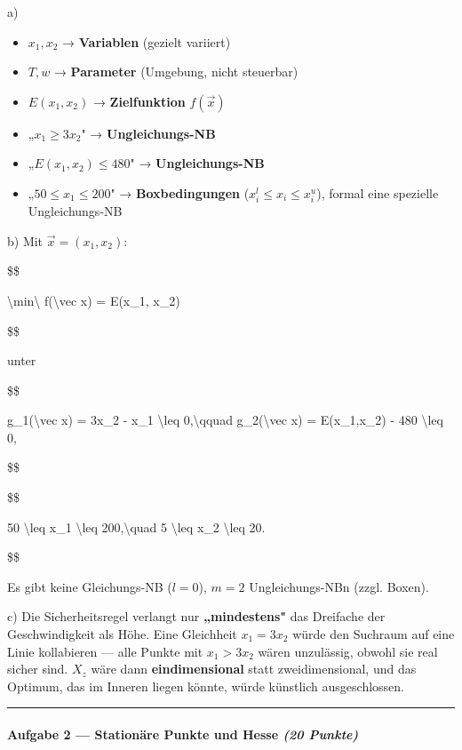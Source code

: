 \documentclass[11pt, a4paper]{article}
\begin{document}
a)

\begin{itemize}
  \item $x_1, x_2$ → \textbf{Variablen} (gezielt variiert)
  \item $T, w$ → \textbf{Parameter} (Umgebung, nicht steuerbar)
  \item $E(x_1,x_2)$ → \textbf{Zielfunktion} $f(\vec x)$
  \item „$x_1 \geq 3x_2$" → \textbf{Ungleichungs-NB}
  \item „$E(x_1,x_2) \leq 480$" → \textbf{Ungleichungs-NB}
  \item „$50 \leq x_1 \leq 200$" → \textbf{Boxbedingungen} ($x_i^l \leq x_i \leq x_i^u$), formal eine spezielle Ungleichungs-NB
\end{itemize}

b) Mit $\vec x = (x_1, x_2)$:

\$\$

\textbackslash{}min\textbackslash{} f(\textbackslash{}vec x) = E(x\_1, x\_2)

\$\$

unter

\$\$

g\_1(\textbackslash{}vec x) = 3x\_2 - x\_1 \textbackslash{}leq 0,\textbackslash{}qquad g\_2(\textbackslash{}vec x) = E(x\_1,x\_2) - 480 \textbackslash{}leq 0,

\$\$

\$\$

50 \textbackslash{}leq x\_1 \textbackslash{}leq 200,\textbackslash{}quad 5 \textbackslash{}leq x\_2 \textbackslash{}leq 20.

\$\$

Es gibt keine Gleichungs-NB ($l=0$), $m=2$ Ungleichungs-NBn (zzgl. Boxen).


c) Die Sicherheitsregel verlangt nur \textbf{„mindestens"} das Dreifache der Geschwindigkeit als Höhe. Eine Gleichheit $x_1 = 3x_2$ würde den Suchraum auf eine Linie kollabieren — alle Punkte mit $x_1 > 3x_2$ wären unzulässig, obwohl sie real sicher sind. $X_z$ wäre dann \textbf{eindimensional} statt zweidimensional, und das Optimum, das im Inneren liegen könnte, würde künstlich ausgeschlossen.



\noindent\textcolor{rulegray}{\rule{\linewidth}{0.4pt}}


\paragraph{Aufgabe 2 — Stationäre Punkte und Hesse \textit{(20 Punkte)}}\mbox{}\\[2pt]
\end{document}
